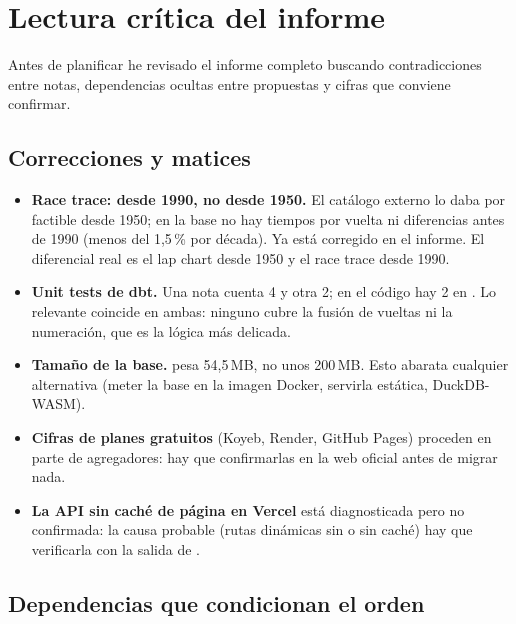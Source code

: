 \documentclass[11pt,openany]{report}
\begin{document}
\tableofcontents
\clearpage

\section{Lectura crítica del informe}

Antes de planificar he revisado el informe completo buscando contradicciones entre notas,
dependencias ocultas entre propuestas y cifras que conviene confirmar.

\subsection*{Correcciones y matices}

\begin{itemize}
  \item \textbf{Race trace: desde 1990, no desde 1950.} El catálogo externo lo daba por factible
  desde 1950; en la base no hay tiempos por vuelta ni diferencias antes de 1990 (menos del 1,5\,\%
  por década). Ya está corregido en el informe. El diferencial real es el lap chart desde 1950 y el
  race trace desde 1990.
  \item \textbf{Unit tests de dbt.} Una nota cuenta 4 y otra 2; en el código hay 2 en
  . Lo relevante coincide en ambas: ninguno cubre la fusión de
  vueltas ni la numeración, que es la lógica más delicada.
  \item \textbf{Tamaño de la base.}  pesa 54,5\,MB, no unos 200\,MB. Esto abarata
  cualquier alternativa (meter la base en la imagen Docker, servirla estática, DuckDB-WASM).
  \item \textbf{Cifras de planes gratuitos} (Koyeb, Render, GitHub Pages) proceden en parte de
  agregadores: hay que confirmarlas en la web oficial antes de migrar nada.
  \item \textbf{La API sin caché de página en Vercel} está diagnosticada pero no confirmada: la causa
  probable (rutas dinámicas sin  o  sin caché) hay que
  verificarla con la salida de .
\end{itemize}

\subsection*{Dependencias que condicionan el orden}
\end{document}
